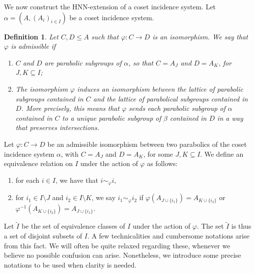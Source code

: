 \documentclass[11pt,letterpaper]{amsart}
\newtheorem{definition}[prop]{Definition}
\begin{document}
We now construct the HNN-extension of a coset incidence system. Let $\alpha = (A, (A_i)_{i \in I})$ be a coset incidence system. 

\begin{definition}
    Let $C,D\leq A$ such that $\varphi: C\to D$ is an isomorphism. We say that $\varphi$ is \emph{admissible} if 
    \begin{enumerate}
        \item $C$ and $D$ are parabolic subgroups of $\alpha$, so that $C=A_J$ and $D=A_K$, for $J,K\subseteq I$;
        \item The isomorphism $\varphi$ induces an isomorphism between the lattice of parabolic subgroups contained in $C$ and the lattice of parabolical subgroups contained in $D$. More precisely, this means that $\varphi$ sends each parabolic subgroup of $\alpha$ contained in $C$ to a unique parabolic subgroup of $\beta$ contained in $D$ in a way that preserves intersections.
    \end{enumerate} 
\end{definition}

Let $\varphi: C\to D$ be an admissible isomorphism between two parabolics of the coset incidence system $\alpha$, with $C=A_J$ and $D=A_K$, for some $J,K\subseteq I$. We define an equivalence relation on $I$ under the action of $\varphi$ as follows: 
\begin{enumerate}
    \item for each $i \in I$, we have that $i \sim_\varphi i$,
    \item for $i_1\in I\setminus J$ and $i_2\in I\setminus K$, we say $i_1 \sim_\varphi i_2$ if $\varphi(A_{J\cup\{i_1\}}) = A_{K\cup\{i_2\}}$ or $\varphi^{-1}(A_{K\cup\{i_2\}}) = A_{J\cup\{i_1\}}$.
\end{enumerate}

Let $\widetilde{I}$ be the set of equivalence classes of $I$ under the action of $\varphi$. 
The set $\widetilde{I}$ is thus a set of disjoint subsets of $I$. A few technicalities and cumbersome notations arise from this fact. We will often be quite relaxed regarding these, whenever we believe no possible confusion can arise. Nonetheless, we introduce some precise notations to be used when clarity is needed.
\end{document}
